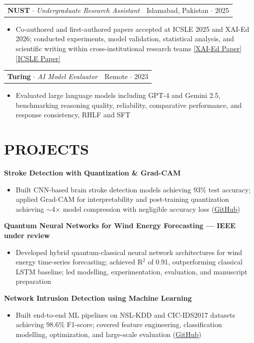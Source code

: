 \documentclass[letterpaper,8.5pt]{article}
\makeatletter
\newcommand{\resumeItem}[1]{
  \item \small{#1}
}
\newcommand{\resumeSubheading}[4]{
  \vspace{1pt}
  \begin{tabular*}{\textwidth}{l@{\extracolsep{\fill}}r}
    \textbf{\small #1} {\color{dark-grey}\small $\cdot$} \textit{\small #3} & {\color{dark-grey}\small #4 $\cdot$ #2} \\
  \end{tabular*}
  \vspace{-5pt}
}
\newcommand{\resumeProjectHeading}[1]{
  \vspace{1pt}
  \textbf{\small #1}
  \vspace{-3pt}
}
\makeatother
\begin{document}
\resumeSubheading{NUST}{2025}{Undergraduate Research Assistant}{Islamabad, Pakistan}
\begin{itemize}
\resumeItem{Co-authored and first-authored papers accepted at ICSLE 2025 and XAI-Ed 2026; conducted experiments, model validation, statistical analysis, and scientific writing within cross-institutional research teams \href{https://www.xai-ed.net/papers/XAI-Ed_2026_paper_1.pdf}{[XAI-Ed Paper]} \href{https://www.researchgate.net/publication/395837132_Barrier-Based_Inclusive_Design_in_VR_Addressing_DEI_Challenges_through_the_UDL_30_Framework}{[ICSLE Paper]}}
\end{itemize}

\resumeSubheading{Turing}{2023}{AI Model Evaluator}{Remote}
\begin{itemize}
\resumeItem{Evaluated large language models including GPT-4 and Gemini 2.5, benchmarking reasoning quality, reliability, comparative performance, and response consistency, RHLF and SFT}
\end{itemize}

\section{PROJECTS}

\resumeProjectHeading{Stroke Detection with Quantization \& Grad-CAM}
\begin{itemize}
\resumeItem{Built CNN-based brain stroke detection models achieving 93\% test accuracy; applied Grad-CAM for interpretability and post-training quantization achieving $\sim$4$\times$ model compression with negligible accuracy loss (\href{https://github.com/92meharali}{GitHub})}
\end{itemize}

\resumeProjectHeading{Quantum Neural Networks for Wind Energy Forecasting \textnormal{— IEEE under review}}
\begin{itemize}
\resumeItem{Developed hybrid quantum-classical neural network architectures for wind energy time-series forecasting; achieved R$^2$ of 0.91, outperforming classical LSTM baseline; led modelling, experimentation, evaluation, and manuscript preparation}
\end{itemize}

\resumeProjectHeading{Network Intrusion Detection using Machine Learning}
\begin{itemize}
\resumeItem{Built end-to-end ML pipelines on NSL-KDD and CIC-IDS2017 datasets achieving 98.6\% F1-score; covered feature engineering, classification modelling, optimization, and large-scale evaluation (\href{https://github.com/92meharali}{GitHub})}
\end{itemize}
\end{document}
